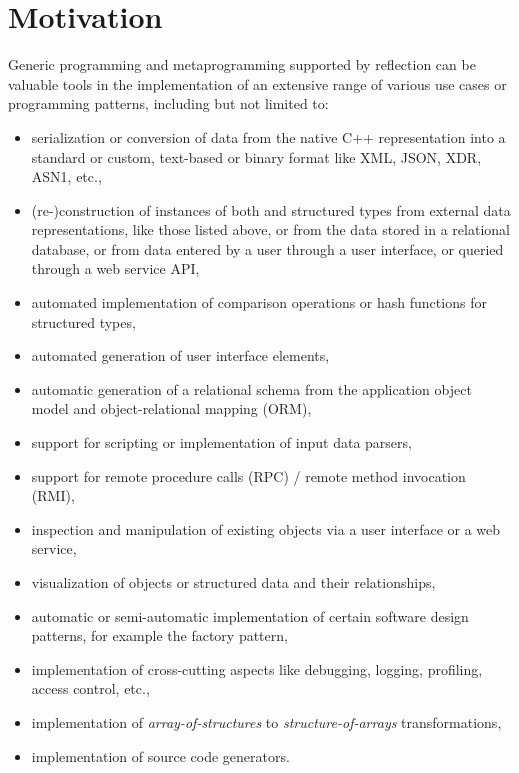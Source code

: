 \section{Motivation}

Generic programming and metaprogramming supported by reflection can be valuable
tools in the implementation of an extensive range of various use cases or
programming patterns, including but not limited to:

\begin{itemize}

\item serialization or conversion of data from the native C++ representation
into a standard or custom, text-based or binary format like XML, JSON, XDR, ASN1,
etc.,

\item (re-)construction of instances of both  and structured types
from external data representations, like those listed above, or
from the data stored in a relational database, or from data entered by
a user through a user interface, or queried through a web service API,

\item automated implementation of comparison operations or hash functions
for structured types,

\item automated generation of user interface elements,

\item automatic generation of a relational schema from the application
object model and object-relational mapping (ORM),

\item support for scripting or implementation of input data parsers,

\item support for remote procedure calls (RPC) / remote method invocation (RMI),

\item inspection and manipulation of existing objects via a user interface
or a web service,

\item visualization of objects or structured data and their relationships,

\item automatic or semi-automatic implementation of certain software design
patterns, for example the factory pattern,

\item implementation of cross-cutting aspects like debugging, logging, profiling,
access control, etc.,

\item implementation of {\em array-of-structures} to {\em structure-of-arrays}
transformations,

\item implementation of source code generators.

\end{itemize}

